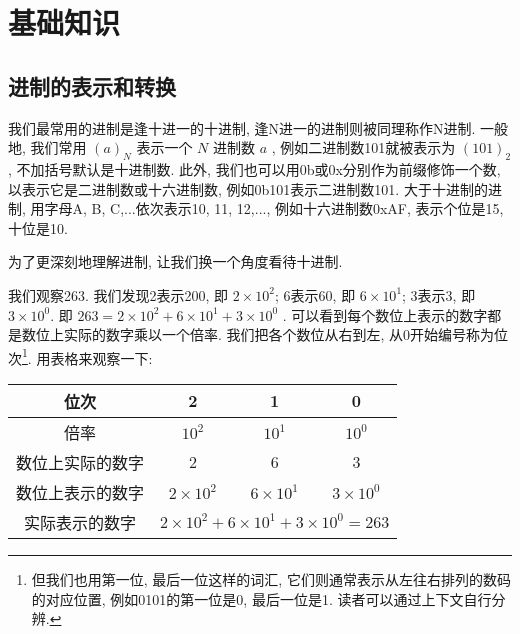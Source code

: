 \chapter{基础知识} \label{基础知识}
\fancyhead[LO]{\bfseries\leftmark}
\fancyhead[RE]{\bfseries\rightmark}
    
    \section{进制的表示和转换} \label{进制的表示与转换}
        我们最常用的进制是逢十进一的十进制, 逢N进一的进制则被同理称作N进制. 一般地, 我们常用 $ (a)_N $ 表示一个 $ N $ 进制数 $ a $ , 例如二进制数101就被表示为 $ (101)_2 $ , 不加括号默认是十进制数. 此外, 我们也可以用0b或0x分别作为前缀修饰一个数, 以表示它是二进制数或十六进制数, 例如0b101表示二进制数101. 大于十进制的进制, 用字母A, B, C,...依次表示10, 11, 12,..., 例如十六进制数0xAF, 表示个位是15, 十位是10.

        为了更深刻地理解进制, 让我们换一个角度看待十进制.

        我们观察263. 我们发现2表示200, 即 $ 2 \times 10 ^ 2 $; 6表示60, 即 $ 6 \times 10 ^ 1 $; 3表示3, 即 $ 3 \times 10 ^ 0 $. 即 $ 263 = 2 \times 10 ^ 2 + 6 \times 10 ^ 1 + 3 \times 10 ^ 0 $ . 可以看到每个数位上表示的数字都是数位上实际的数字乘以一个倍率. 我们把各个数位从右到左, 从0开始编号称为位次\footnote{但我们也用第一位, 最后一位这样的词汇, 它们则通常表示从左往右排列的数码的对应位置, 例如0101的第一位是0, 最后一位是1. 读者可以通过上下文自行分辨.}. 用表格来观察一下:
        \begin{center}
            \begin{tabular}{|c|c|c|c|}
                \hline
                位次                & 2                     & 1                     & 0                     \\
                \hline
                倍率                & $ 10 ^ 2 $            & $ 10 ^ 1 $            & $ 10 ^ 0 $            \\
                \hline
                数位上实际的数字     & 2                     & 6                     & 3                     \\
                \hline
                数位上表示的数字     & $ 2 \times 10 ^ 2 $   & $ 6 \times 10 ^ 1 $   & $ 3 \times 10 ^ 0 $   \\
                \hline
                实际表示的数字       & \multicolumn{3}{|c|}{ $ 2 \times 10 ^ 2 + 6 \times 10 ^ 1 + 3 \times 10 ^ 0 = 263 $ }\\
                \hline
            \end{tabular}
        \end{center}

